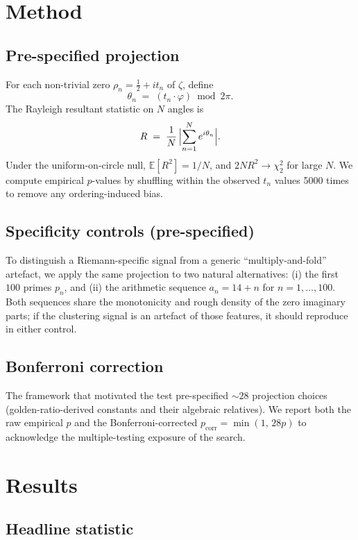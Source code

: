\documentclass[11pt,a4paper]{article}
\begin{document}
\section{Method}

\subsection{Pre-specified projection}

For each non-trivial zero $\rho_n = \tfrac{1}{2} + i t_n$ of $\zeta$, define
\[
   \theta_n \;=\; (t_n \cdot \varphi) \bmod 2\pi.
\]
The Rayleigh resultant statistic on $N$ angles is
\[
   R \;=\; \frac{1}{N}\,\Bigl\lvert \sum_{n=1}^{N} e^{i \theta_n} \Bigr\rvert.
\]
Under the uniform-on-circle null, $\mathbb E[R^2] = 1/N$, and
$2 N R^2 \to \chi^2_2$ for large $N$. We compute empirical $p$-values
by shuffling within the observed $t_n$ values 5000 times to remove any
ordering-induced bias.

\subsection{Specificity controls (pre-specified)}

To distinguish a Riemann-specific signal from a generic
``multiply-and-fold'' artefact, we apply the same projection to two
natural alternatives: (i) the first $100$ primes $p_n$, and (ii) the
arithmetic sequence $a_n = 14 + n$ for $n = 1,\dots,100$. Both
sequences share the monotonicity and rough density of the zero imaginary
parts; if the clustering signal is an artefact of those features, it
should reproduce in either control.

\subsection{Bonferroni correction}

The framework that motivated the test pre-specified $\sim 28$ projection
choices (golden-ratio-derived constants and their algebraic relatives).
We report both the raw empirical $p$ and the Bonferroni-corrected
$p_{\text{corr}} = \min(1,\, 28 p)$ to acknowledge the multiple-testing
exposure of the search.

\section{Results}

\subsection{Headline statistic}
\end{document}
